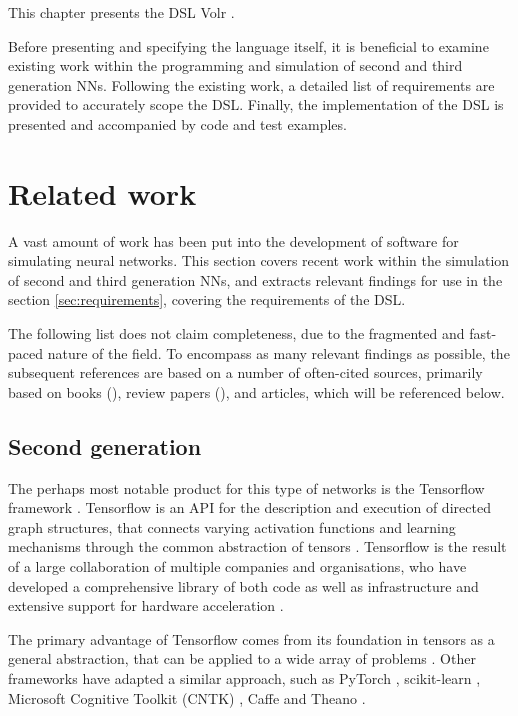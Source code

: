 \documentclass[report.tex]{subfiles}
\begin{document}
This chapter presents the \gls{DSL} Volr .

Before presenting and specifying the language itself, 
it is beneficial to examine existing work within the
programming and simulation of second and third
generation \glspl{NN}.
Following the existing work, a detailed list of requirements
are provided to accurately scope the \gls{DSL}.
Finally, the implementation of the \gls{DSL} is presented and
accompanied by code and test examples.

\section{Related work}
A vast amount of work has been put into the development of software for simulating
neural networks.
This section covers recent work within the simulation of second and third
generation \glspl{NN}, and extracts relevant findings for use in the section \ref{sec:requirements}, covering the requirements of the DSL.

The following list does not claim completeness, due to the fragmented and 
fast-paced nature of the field.
To encompass as many relevant findings as possible, the subsequent
references are based on a number of often-cited sources, primarily based on books
(\cite{Bishop2006, Russel2007, Eliasmith2015, Lin2018, Nilsson2009, Pearl1988, Rojas1996, Rumelhart1988}), review papers 
(\cite{Schmidhuber2014, Blundell2018, Markram2013, Walter2015, Hunsberger2015}),
and articles, which will be referenced below.

\subsection{Second generation}
The perhaps most notable product for this type of networks is the Tensorflow 
framework \cite{Abadi2016}.
Tensorflow is an \gls{API} for the description and execution of directed graph 
structures,
that connects varying activation functions and learning mechanisms through the common abstraction
of tensors \cite{Abadi2015}.
Tensorflow is the result of a large collaboration of multiple companies and organisations, who have
developed a comprehensive library of both code as well as infrastructure and extensive support for hardware acceleration \cite{Abadi2015}.

The primary advantage of Tensorflow  comes from 
its foundation in tensors as a general abstraction, that
can be applied to a wide array of problems \cite{Abadi2016}.
Other frameworks have adapted a similar approach, such as PyTorch \cite{PyTorch2018}, 
scikit-learn \cite{Sklearn2018}, Microsoft Cognitive Toolkit (CNTK) \cite{CNTK2018},
Caffe \cite{Caffe2018} and Theano \cite{Theano2018}.
\end{document}
